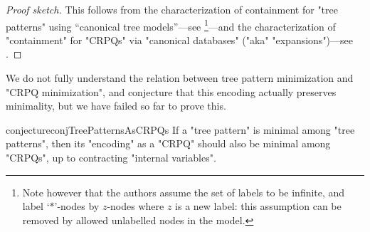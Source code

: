 \begin{proof}[Proof sketch]
	This follows from the characterization of containment for "tree patterns"
	using ``canonical tree models''---see \cite[\S4.2]{CzerwinskiMartensNiewerthParys2018Minimization}\footnote{Note
	however that the authors assume the set of labels to be infinite, and label `$*$'-nodes
	by $z$-nodes where $z$ is a new label: this assumption can be removed by
	allowed unlabelled nodes in the model.}---and the characterization of "containment" for "CRPQs"
	via "canonical databases" ("aka" "expansions")---see .
\end{proof}

We do not fully understand the relation between tree pattern minimization and "CRPQ minimization", 
and conjecture that this encoding actually preserves minimality, but we have failed so far to prove this. 

\begin{restatable}{conjecture}{conjTreePatternsAsCRPQs}
	If a "tree pattern" is minimal among "tree patterns", 
	then its "encoding" as a "CRPQ" should also be minimal among "CRPQs", up to contracting "internal variables".
\end{restatable}